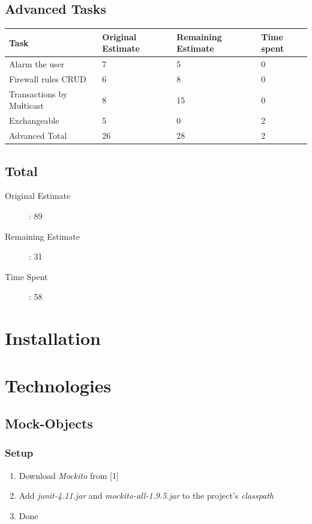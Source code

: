 \documentclass[11pt, a4paper]{article}
\begin{document}
\subsection{Advanced Tasks}
\begin{tabular} {| l | l | l | l |}\hline
Task &	Original Estimate & Remaining Estimate & Time spent \\ \hline
Alarm the user &	7	& 5	& 0 \\ \hline
Firewall rules CRUD &	6 &	8 & 	0 \\ \hline
Transactions by Multicast &	8 &	15 &	0 \\ \hline
Exchangeable & 5 & 0	 & 2 \\ \hline
Advanced Total & 26 &	28 &	2 \\ \hline
\end{tabular}

\subsection{Total}
\begin{description}
	\item[Original Estimate]: 89
	\item[Remaining Estimate]: 31
	\item[Time Spent]: 58
\end{description}

\section{Installation}

\section{Technologies}
\subsection{Mock-Objects}
\subsubsection{Setup}

\begin{enumerate}
	\item Download \textit{Mockito} from [1]
	\item Add \textit{junit-4.11.jar} and \textit{mockito-all-1.9.5.jar} to the project's \textit{classpath}
	\item Done
\end{enumerate}
\end{document}

